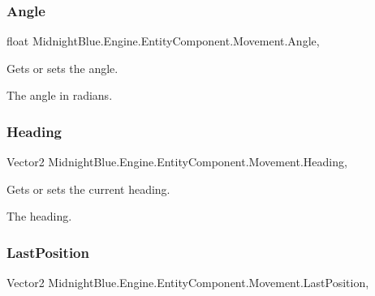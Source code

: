 \subsubsection{\texorpdfstring{Angle}{Angle}}
{\footnotesize\ttfamily float Midnight\+Blue.\+Engine.\+Entity\+Component.\+Movement.\+Angle\hspace{0.3cm}{\ttfamily [get]}, {\ttfamily [set]}}



Gets or sets the angle. 

The angle in radians.\hypertarget{class_midnight_blue_1_1_engine_1_1_entity_component_1_1_movement_a61bee5da88e34141dbee5b105711367f}{}\label{class_midnight_blue_1_1_engine_1_1_entity_component_1_1_movement_a61bee5da88e34141dbee5b105711367f} 
\subsubsection{\texorpdfstring{Heading}{Heading}}
{\footnotesize\ttfamily Vector2 Midnight\+Blue.\+Engine.\+Entity\+Component.\+Movement.\+Heading\hspace{0.3cm}{\ttfamily [get]}, {\ttfamily [set]}}



Gets or sets the current heading. 

The heading.\hypertarget{class_midnight_blue_1_1_engine_1_1_entity_component_1_1_movement_aba9c089ad947199089bf7d37fa884581}{}\label{class_midnight_blue_1_1_engine_1_1_entity_component_1_1_movement_aba9c089ad947199089bf7d37fa884581} 
\subsubsection{\texorpdfstring{Last\+Position}{LastPosition}}
{\footnotesize\ttfamily Vector2 Midnight\+Blue.\+Engine.\+Entity\+Component.\+Movement.\+Last\+Position\hspace{0.3cm}{\ttfamily [get]}, {\ttfamily [set]}}



